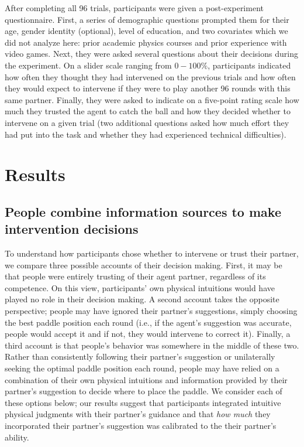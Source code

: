 \documentclass[10pt,letterpaper]{article}
\begin{document}
After completing all 96 trials, participants were given a post-experiment questionnaire. First, a series of demographic questions prompted them for their age, gender identity (optional), level of education, and two covariates which we did not analyze here: prior academic physics courses and prior experience with video games. Next, they were asked several questions about their decisions during the experiment. On a slider scale ranging from $0-100\%$, participants indicated how often they thought they had intervened on the previous trials and how often they would expect to intervene if they were to play another 96 rounds with this same partner. Finally, they were asked to indicate on a five-point rating scale how much they trusted the agent to catch the ball and how they decided whether to intervene on a given trial (two additional questions asked how much effort they had put into the task and whether they had experienced technical difficulties).


\section{Results}

\subsection{People combine information sources to make intervention decisions}

To understand how participants chose whether to intervene or trust their partner, we compare three possible accounts of their decision making. First, it may be that people were entirely trusting of their agent partner, regardless of its competence. On this view, participants' own physical intuitions would have played no role in their decision making. A second account takes the opposite perspective; people may have ignored their partner's suggestions, simply choosing the best paddle position each round (i.e., if the agent's suggestion was accurate, people would accept it and if not, they would intervene to correct it). Finally, a third account is that people's behavior was somewhere in the middle of these two. Rather than consistently following their partner's suggestion or unilaterally seeking the optimal paddle position each round, people may have relied on a combination of their own physical intuitions and information provided by their partner's suggestion to decide where to place the paddle. We consider each of these options below; our results suggest that participants integrated intuitive physical judgments with their partner's guidance and that \textit{how much} they incorporated their partner's suggestion was calibrated to the their partner's ability.
\end{document}
